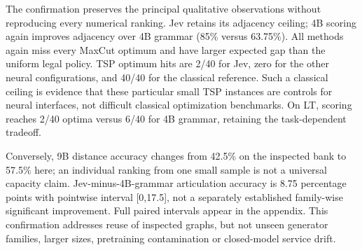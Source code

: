 The confirmation preserves the principal qualitative observations without
reproducing every numerical ranking. Jev retains its adjacency ceiling;
4B scoring again improves adjacency over 4B grammar (85\% versus 63.75\%).
All methods again miss every MaxCut optimum and have larger expected
gap than the uniform legal policy. TSP optimum hits are 2/40 for Jev,
zero for the other neural configurations, and 40/40 for the classical
reference. Such a classical ceiling is evidence that these particular small
TSP instances are controls for neural interfaces, not difficult classical
optimization benchmarks. On LT, scoring reaches 2/40 optima versus 6/40
for 4B grammar, retaining the task-dependent tradeoff.

Conversely, 9B distance accuracy changes from 42.5\% on the inspected bank to
57.5\% here; an individual ranking from one small sample is not a universal
capacity claim. Jev-minus-4B-grammar articulation accuracy is 8.75 percentage
points with pointwise interval [0,17.5], not a separately established
family-wise significant improvement. Full paired intervals appear in the
appendix. This confirmation addresses reuse of inspected graphs, but not
unseen generator families, larger sizes, pretraining contamination or
closed-model service drift.
